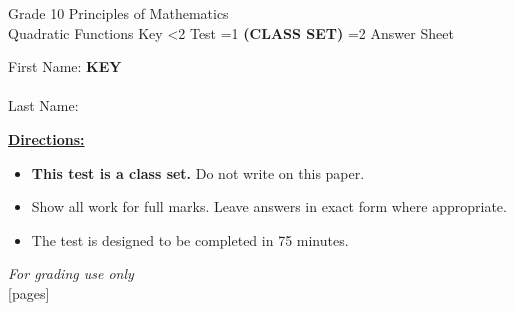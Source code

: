 \documentclass[addpoints]{exam}
\newcommand{\event}{Quadratic Functions}
\newcommand{\tournament}{}
\def\type{0}
\begin{document}
\begin{center}
    {\huge Grade 10 Principles of Mathematics \\ \event
    \ifprintanswers \space Key
    \else \space \ifnum\type<2 Test \fi \ifnum\type=1 \textbf{(CLASS SET)} \fi
          \ifnum\type=2 Answer Sheet \fi
    \fi \\ \vspace{3mm}\tournament\vspace{1mm}}
\end{center}

\vspace{.25\textheight}

\begin{center}
    First Name: \ifprintanswers
    \underline{\hspace{3.5cm}}\textbf{KEY}\underline{\hspace{5.5cm}}\\\ \vspace{5mm}
    \else \underline{\hspace{10cm}}\\ \vspace{5mm} \fi
    Last Name: \underline{\hspace{10cm}}\\ \vspace{5mm}
\end{center}

\noindent\textbf{\underline{Directions:}}
\begin{itemize}
    \ifnum\type=1 \item \textbf{This test is a class set.} Do not write on this paper. \fi
    \item Show all work for full marks. Leave answers in exact form where appropriate.
    \item The test is designed to be completed in 75 minutes.
\end{itemize}
\begin{center}
\textit{For grading use only}\\
[pages]
\end{center}
\end{document}
